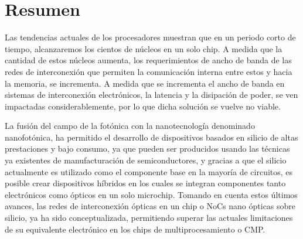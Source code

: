 \section{Resumen}
Las tendencias actuales de los procesadores muestran que en un periodo corto de tiempo, 
alcanzaremos los cientos de núcleos en un solo chip. 
A medida que la cantidad de estos núcleos aumenta, los requerimientos de ancho de banda 
de las redes de interconexión que permiten la comunicación interna entre estos y 
hacia la memoria, se incrementa. A medida que se incrementa el ancho de banda en 
sistemas de interconexión electrónicos, la latencia y la disipación de poder, 
se ven impactadas considerablemente, por lo que dicha solución se vuelve no viable.

La fusión del campo de la fotónica con la nanotecnología denominado 
nanofotónica, ha permitido el desarrollo de dispositivos
basados en silicio de altas prestaciones y bajo consumo, ya que pueden 
ser producidos usando las técnicas ya existentes de manufacturación de semiconductores, 
y gracias a que el silicio actualmente es utilizado como el componente base 
en la mayoría de circuitos, es posible crear dispositivos híbridos en los cuales 
se integran componentes tanto electrónicos como ópticos en un solo microchip. 
Tomando en cuenta estos últimos avances, las redes de interconexión ópticas 
en un chip o NoCs nano ópticas sobre silicio, ya ha sido conceptualizada, 
permitiendo superar las actuales limitaciones de su equivalente electrónico 
en los chips de multiprocesamiento o CMP.

\begin{comment}
En este proyecto se evalúa el comportamiento de los elementos básicos que conforman
los dispositivos fotónicos. Esta caracterización a nivel físico, permite tener un
mayor control sobre los parámetros con los que se simula su comportamiento a nivel
de un sistema completo de
en
una capa de abstracción superior

También se analizan diferentes diseños de 
arquitecturas que permiten analizar el impacto de las NoCs ópticas en 
las futuras generaciones de CMPs. 

Este impacto es de vital importancia para 
lograr el aumento en el rendimiento manteniendo al mismo tiempo la eficiencia 
en el consumo de potencia.

Al finalizar, se tendrán los análsis comparativos en términos de ancho de banda, 
potencia y latencia de algunas de las redes de interconexión más conocidas 
sobre diferentes conjuntos de pruebas. La aplicación de este conocimiento 
científico orientado al área de arquitectura de computadores y a la nanotecnología, 
permitirá la creación de nuevos diseños que aporten a la solución de los
problemas de rendimiento vs potencia, apuntando a mejorar la competitividad 
nacional mediante la generación de producción intelectual en dicho aspecto.
\end{comment}

